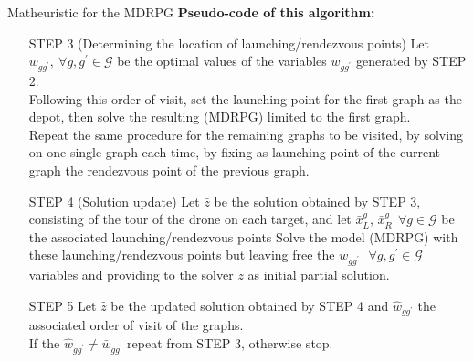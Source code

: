 \documentclass[slidestop,usepdftitle=false,10pt]{beamer}
\begin{document}
    \begin{frame}{Matheuristic for the MDRPG}
    \textbf{Pseudo-code of this algorithm:}
    \begin{itemize}
        \small
            \item[STEP 3] (Determining the location of launching/rendezvous points)
            Let $\bar{w}_{gg^{'}}, \: \forall g,g^{'} \in \mathcal G$ be the optimal values of the variables $w_{gg^{'}}$ generated by STEP 2.\\
            Following this order of visit, set the launching point for the first graph as the depot, then solve the resulting (MDRPG) limited to the first graph.\\
            Repeat the same procedure for the remaining graphs to be visited, by solving \AMD\xspace on one single graph each time, by fixing as launching point of the current graph the rendezvous point of the previous graph.
            
            \item [STEP 4] (Solution update) 
            Let $\bar{z}$ be the solution obtained by STEP 3, consisting of the tour of the drone on each target,  %
            and let $\bar{x}_{L}^{g}$, $\bar{x}_{R}^{g} \:\: \forall g \in \mathcal G$ be the associated launching/rendezvous points %
            Solve the model (MDRPG) with these launching/rendezvous points but leaving free the $w_{gg^{'}} \:\:\ \forall g,g^{'} \in \mathcal G$ variables and providing to the solver $\bar{z}$ as initial partial solution.
            \item [STEP 5]
            Let $\hat{z}$ be the updated solution obtained by STEP 4 %
            and $\hat{w}_{gg^{'}}$ the associated order of visit of the graphs.\\
            If the $\hat{w}_{gg^{'}} \neq \bar{w}_{gg^{'}}$ repeat from STEP 3, otherwise stop.
            \end{itemize}
	\end{frame}
\end{document}
